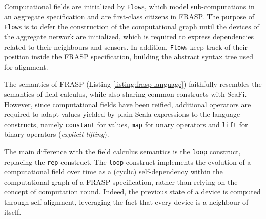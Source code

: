 Computational fields are initialized by \texttt{Flow}s, which model
sub-computations in an aggregate specification and are first-class citizens in
FRASP. The purpose of \texttt{Flow}s is to defer the construction of the
computational graph until the devices of the aggregate network are initialized,
which is required to express dependencies related to their neighbours and
sensors. In addition, \texttt{Flow}s keep track of their position inside the
FRASP specification, building the abstract syntax tree used for alignment.

The semantics of FRASP (Listing \ref{listing:frasp-language}) faithfully
resembles the semantics of field calculus, while also sharing common constructs
with \ac{ScaFi}. However, since computational fields have been reified,
additional operators are required to adapt values yielded by plain Scala
expressions to the language constructs, namely \texttt{constant} for values,
\texttt{map} for unary operators and \texttt{lift} for binary operators
(\textit{explicit lifting}).

The main difference with the field calculus semantics is the \texttt{loop}
construct, replacing the \texttt{rep} construct. The \texttt{loop} construct
implements the evolution of a computational field over time as a (cyclic)
self-dependency within the computational graph of a FRASP specification, rather
than relying on the concept of computation round. Indeed, the previous state of
a device is computed through self-alignment, leveraging the fact that every
device is a neighbour of itself.



